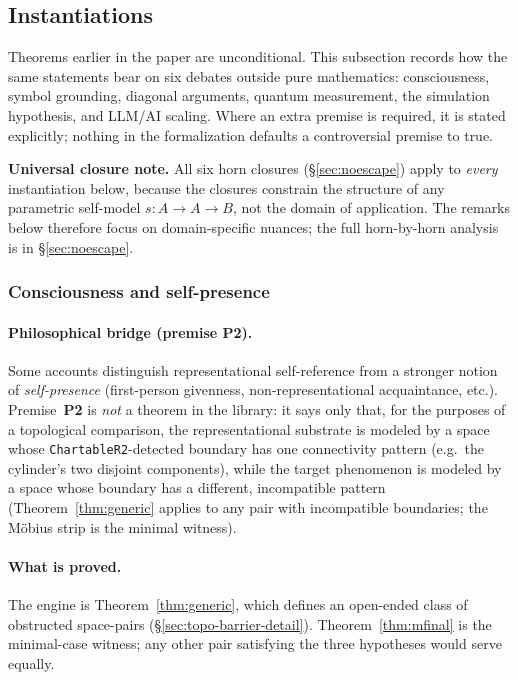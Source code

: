 \documentclass[11pt]{article}
\begin{document}
\subsection{Instantiations}
\label{sec:instantiations}

Theorems earlier in the paper are unconditional. This subsection records how the
same statements bear on six debates outside pure mathematics:
consciousness, symbol grounding, diagonal arguments, quantum measurement,
the simulation hypothesis, and LLM/AI scaling.
Where an extra premise is required, it is stated explicitly; nothing in the
formalization defaults a controversial premise to true.

\medskip
\noindent\textbf{Universal closure note.}
All six horn closures (\S\ref{sec:noescape}) apply to \emph{every}
instantiation below, because the closures constrain the structure of
any parametric self-model $s : A \to A \to B$, not the domain of
application.  The remarks below therefore focus on domain-specific
nuances; the full horn-by-horn analysis is in \S\ref{sec:noescape}.

\subsubsection{Consciousness and self-presence}

\paragraph{Philosophical bridge (premise P2).}
Some accounts distinguish representational self-reference from a stronger notion
of \emph{self-presence} (first-person givenness, non-representational
acquaintance, etc.). Premise~\textbf{P2} is \emph{not} a theorem in the library:
it says only that, for the purposes of a topological comparison, the
representational substrate is modeled by a space whose
\texttt{ChartableR2}-detected boundary has one connectivity pattern (e.g.\
the cylinder's two disjoint components), while the target phenomenon is modeled
by a space whose boundary has a different, incompatible pattern
(Theorem~\ref{thm:generic} applies to any pair with incompatible
boundaries; the M\"obius strip is the minimal witness).

\paragraph{What is proved.}
The engine is Theorem~\ref{thm:generic}, which defines an
open-ended class of obstructed space-pairs (\S\ref{sec:topo-barrier-detail}).
Theorem~\ref{thm:mfinal} is the minimal-case witness; any other
pair satisfying the three hypotheses would serve equally.
\end{document}
